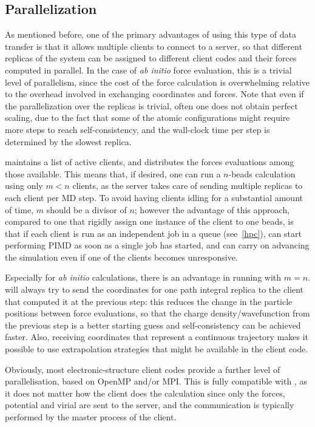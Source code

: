 \documentclass[11pt,english,fleqn]{report}
\begin{document}
\subsection{Parallelization}

As mentioned before, one of the primary advantages of using this type
of data transfer is that it allows multiple clients to connect
to a \ipi server, so that different replicas of the system can be
assigned to different client codes and their forces computed in parallel.
In the case of \emph{ab initio} force evaluation, this is a trivial
level of parallelism, since the cost of the force calculation
is overwhelming relative to the overhead involved in exchanging 
coordinates and forces. Note that even if the parallelization over
the replicas is trivial, often one does not obtain perfect scaling,
due to the fact that some of the atomic configurations might require
more steps to reach self-consistency, and the wall-clock time per step
is determined by the slowest replica.

\ipi maintains a list of active clients, and distributes the forces
evaluations among those available. This means that, if desired, one 
can run a $n$-beads calculation using only $m<n$ clients, as the 
server takes care of sending multiple replicas to each client per 
MD step. To avoid having clients idling for a substantial amount
of time, $m$ should be a divisor of $n$; however the advantage of 
this approach, compared to one that rigidly assign one instance of
the client to one beads, is that if each client is run as an independent
job in a queue (see~\ref{hpc}), \ipi can start performing PIMD
as soon as a single job has started, and can carry on advancing the
simulation even if one of the clients becomes unresponsive.

Especially for \emph{ab initio} calculations, there is an advantage
in running with $m=n$. \ipi will always try to send the coordinates for one
path integral replica to the client that computed it at the previous 
step: this reduces the change in the particle positions between 
force evaluations, so that the charge density/wavefunction from the 
previous step is a better starting guess and self-consistency can be 
achieved faster. Also, receiving coordinates that represent a continuous
trajectory makes it possible to use extrapolation
strategies that might be available in the client code.

Obviously, most electronic-structure client codes provide a further level
of parallelisation, based on OpenMP and/or MPI. This is fully compatible with
\ipi, as it does not matter how the client does the calculation since
only the forces, potential and virial are sent to the server, and the communication
is typically performed by the master process of the client. 
\end{document}
